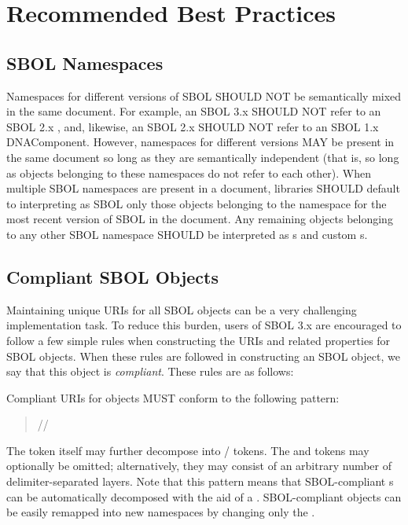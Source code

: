 \section{Recommended Best Practices}
\label{sec:bestpractices}
\subsection{SBOL Namespaces}

Namespaces for different versions of SBOL SHOULD NOT be semantically mixed in the same document. For example, an SBOL 3.x  SHOULD NOT refer to an SBOL 2.x , and, likewise, an SBOL 2.x  SHOULD NOT refer to an SBOL 1.x DNAComponent. However, namespaces for different versions MAY be present in the same document so long as they are semantically independent (that is, so long as objects belonging to these namespaces do not refer to each other). When multiple SBOL namespaces are present in a document, libraries SHOULD default to interpreting as SBOL only those objects belonging to the namespace for the most recent version of SBOL in the document. Any remaining objects belonging to any other SBOL namespace SHOULD be interpreted as s and custom s.

\subsection{Compliant SBOL Objects}
\label{sec:compliant}

Maintaining unique URIs for all SBOL objects can be a very challenging implementation task.  To reduce this burden, users of SBOL 3.x are encouraged to follow a few simple rules when constructing the URIs and related properties for SBOL objects.  When these rules are followed in constructing an SBOL object, we say that this object is \emph{compliant}. These rules are as follows:

Compliant URIs for  objects MUST conform to the following pattern:
\begin{quotation} 
//
\end{quotation}

The  token itself may further decompose into / tokens. The  and  tokens may optionally be omitted; alternatively, they may consist of an arbitrary number of delimiter-separated layers. Note that this pattern means that SBOL-compliant s can be automatically decomposed with the aid of a . SBOL-compliant objects can be easily remapped into new namespaces by changing only the .

